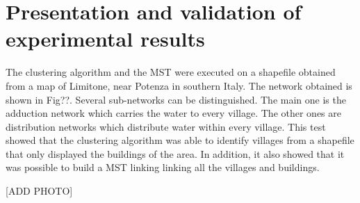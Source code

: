 \chapter{Presentation and validation of experimental results }
\label{capitolo6}
\thispagestyle{empty}



\noindent
The clustering algorithm and the MST were executed on a shapefile obtained from a map of Limitone,
near Potenza in southern Italy. The network obtained is shown in Fig??.
Several sub-networks can be distinguished. The main one is the adduction network which carries the water to
every village. The other ones are distribution networks which distribute water within every village.
This test showed that the clustering algorithm was able to identify villages from a shapefile that only
displayed the buildings of the area. In addition, it also showed that it was possible to build a MST linking
linking all the villages and buildings.

[ADD PHOTO]

\paragraph {} 